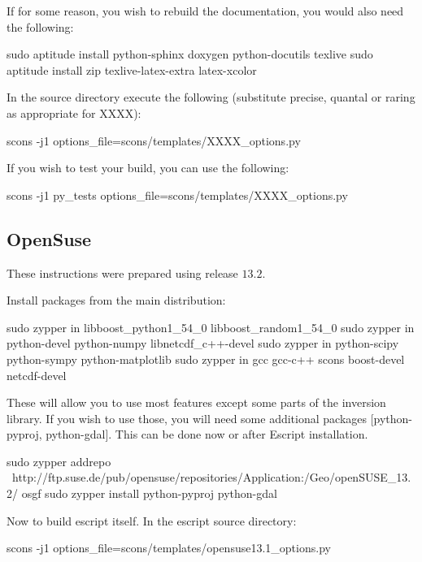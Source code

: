 \begin{optionalstep}
If for some reason, you wish to rebuild the documentation, you would also need the following:
\begin{shellCode}
sudo aptitude install python-sphinx doxygen python-docutils texlive 
sudo aptitude install zip texlive-latex-extra latex-xcolor 
\end{shellCode}
\end{optionalstep}

\noindent In the source directory execute the following (substitute precise, quantal or raring as appropriate for XXXX):
\begin{shellCode}
scons -j1 options_file=scons/templates/XXXX_options.py
\end{shellCode}

\noindent If you wish to test your build, you can use the following:
\begin{shellCode}
scons -j1 py_tests options_file=scons/templates/XXXX_options.py 
\end{shellCode}



\subsection{OpenSuse}\label{sec:susesrc}
These instructions were prepared using release $13.2$.

\noindent Install packages from the main distribution:
\begin{shellCode}
sudo zypper in libboost_python1_54_0 libboost_random1_54_0 
sudo zypper in python-devel python-numpy libnetcdf_c++-devel
sudo zypper in python-scipy python-sympy python-matplotlib 
sudo zypper in gcc gcc-c++ scons boost-devel netcdf-devel
\end{shellCode}
These will allow you to use most features except some parts of the \downunder inversion library.
If you wish to use those, you will need some additional packages [python-pyproj, python-gdal].
This can be done now or after Escript installation.

\begin{shellCode}
sudo zypper addrepo \ 
 http://ftp.suse.de/pub/opensuse/repositories/Application:/Geo/openSUSE_13.2/ osgf
sudo zypper install python-pyproj python-gdal
\end{shellCode}

Now to build escript itself.
In the escript source directory:
\begin{shellCode}
scons -j1 options_file=scons/templates/opensuse13.1_options.py
\end{shellCode}

